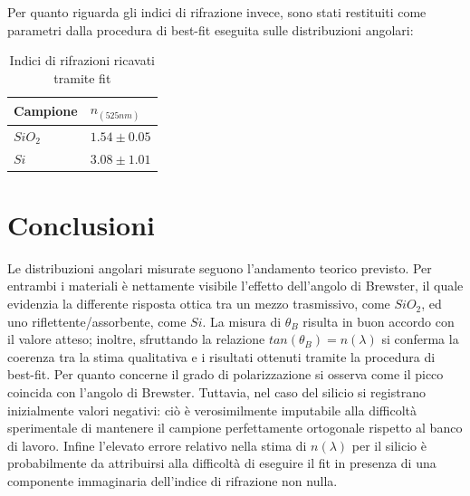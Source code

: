 \documentclass[a4paper,12pt]{article}
\begin{document}
Per quanto riguarda gli indici di rifrazione invece, sono stati restituiti come parametri dalla procedura di best-fit eseguita sulle distribuzioni angolari:

\begin{table}[H]
    \centering
    \begin{tabular}{
        l
        l
    }
        \toprule
        Campione & $n_{(525nm)}$ \\
        \midrule
        $SiO_2$ & $1.54\pm0.05$ \\
        $Si$ & $3.08\pm1.01$\\
        \bottomrule
    \end{tabular}
    \caption{Indici di rifrazioni ricavati tramite fit}
\end{table}

\section{Conclusioni}
Le distribuzioni angolari misurate seguono l'andamento teorico previsto. Per entrambi i materiali è nettamente visibile l'effetto dell'angolo di Brewster, il quale evidenzia la differente risposta ottica tra un mezzo trasmissivo, come $SiO_2$, ed uno riflettente/assorbente, come $Si$.
La misura di $\theta_B$ risulta in buon accordo con il valore atteso; inoltre, sfruttando la relazione $tan(\theta_B) = n(\lambda)$ si conferma la coerenza tra la stima qualitativa e i risultati ottenuti tramite la procedura di best-fit.
Per quanto concerne il grado di polarizzazione si osserva come il picco coincida con l'angolo di Brewster. Tuttavia, nel caso del silicio si registrano inizialmente valori negativi: ciò è verosimilmente imputabile alla difficoltà sperimentale di mantenere il campione perfettamente ortogonale rispetto al banco di lavoro.
Infine l'elevato errore relativo nella stima di $n(\lambda)$ per il silicio è probabilmente da attribuirsi alla difficoltà di eseguire il fit in presenza di una componente immaginaria dell'indice di rifrazione non nulla.
\end{document}
